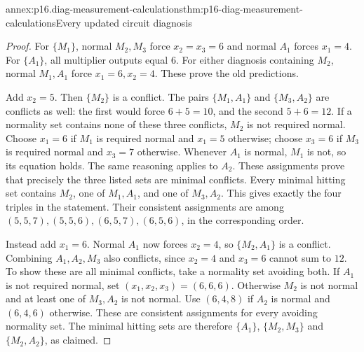 \begin{annexitem}{annex:p16.diag-measurement-calculations}{thm:p16-diag-measurement-calculations}{Every updated circuit diagnosis}
\begin{proof}
For \(\{M_1\}\), normal \(M_2,M_3\) force
\(x_2=x_3=6\) and normal \(A_1\) forces
\(x_1=4\). For \(\{A_1\}\), all multiplier
outputs equal \(6\). For either diagnosis
containing \(M_2\), normal \(M_1,A_1\) force
\(x_1=6,x_2=4\). These prove the old
predictions.

Add \(x_2=5\). Then \(\{M_2\}\) is a
conflict. The pairs \(\{M_1,A_1\}\) and
\(\{M_3,A_2\}\) are conflicts as well:
the first would force \(6+5=10\), and the
second \(5+6=12\). If a normality set contains
none of these three conflicts, \(M_2\) is
not required normal. Choose \(x_1=6\) if
\(M_1\) is required normal and \(x_1=5\)
otherwise; choose \(x_3=6\) if \(M_3\)
is required normal and \(x_3=7\) otherwise.
Whenever \(A_1\) is normal, \(M_1\) is not,
so its equation holds. The same reasoning
applies to \(A_2\). These assignments prove
that precisely the three listed sets are
minimal conflicts. Every minimal hitting set
contains \(M_2\), one of \(M_1,A_1\), and
one of \(M_3,A_2\). This gives exactly the
four triples in the statement. Their consistent
assignments are among \((5,5,7),(5,5,6),
(6,5,7),(6,5,6)\), in the corresponding order.

Instead add \(x_1=6\). Normal \(A_1\) now
forces \(x_2=4\), so \(\{M_2,A_1\}\) is
a conflict. Combining \(A_1,A_2,M_3\)
also conflicts, since \(x_2=4\) and
\(x_3=6\) cannot sum to \(12\).
To show these are all minimal conflicts,
take a normality set avoiding both.
If \(A_1\) is not required normal, set
\((x_1,x_2,x_3)=(6,6,6)\).
Otherwise \(M_2\) is not normal and at
least one of \(M_3,A_2\) is not normal.
Use \((6,4,8)\) if \(A_2\) is normal
and \((6,4,6)\) otherwise.
These are consistent assignments for every
avoiding normality set. The minimal hitting
sets are therefore \(\{A_1\}\),
\(\{M_2,M_3\}\) and \(\{M_2,A_2\}\),
as claimed.
\end{proof}
\end{annexitem}

